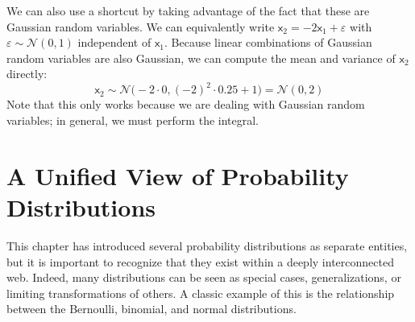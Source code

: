 \begin{exampleBox}
    
    
    We can also use a shortcut by taking advantage of the fact that these are Gaussian random variables. We can equivalently write $\mathsf{x}_2=-2\mathsf{x}_1+\varepsilon$ with $\varepsilon\sim\mathcal{N}(0,1)$ independent of $\mathsf{x}_1$. Because linear combinations of Gaussian random variables are also Gaussian, we can compute the mean and variance of $\mathsf{x}_2$ directly:
    \begin{equation}
        \mathsf{x}_2 \sim \mathcal{N}\!\big(-2\cdot 0,(-2)^2\cdot 0.25 + 1\big)=\mathcal{N}(0,2)
    \end{equation}
    Note that this only works because we are dealing with Gaussian random variables; in general, we must perform the integral.
\end{exampleBox}

\section{A Unified View of Probability Distributions}

This chapter has introduced several probability distributions as separate entities, but it is important to recognize that they exist within a deeply interconnected web. Indeed, many distributions can be seen as special cases, generalizations, or limiting transformations of others. A classic example of this is the relationship between the Bernoulli, binomial, and normal distributions.

